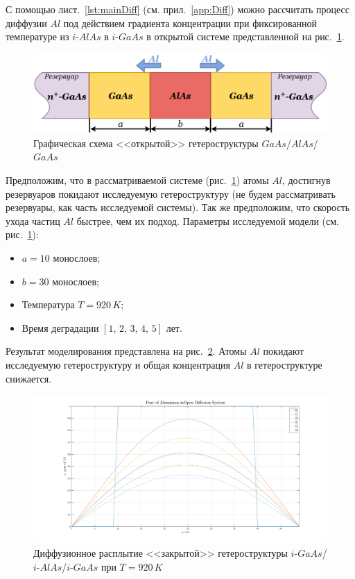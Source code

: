 С помощью лист.~\ref{lst:mainDiff} (см. прил.~\ref{app:Diff}) можно рассчитать процесс диффузии $Al$ под действием градиента концентрации при фиксированной температуре из $i$-$AlAs$ в $i$-$GaAs$ в открытой системе представленной на рис.~\ref{fig:DOpeneBox}.
\begin{figure}[h!]
	\centering
	\includegraphics[width=0.9\linewidth]{assets/DOpenBox}
	\caption{Графическая схема <<открытой>> гетероструктуры $GaAs$/$AlAs$/$GaAs$}
	\label{fig:DOpeneBox}
\end{figure}

Предположим, что в рассматриваемой системе (рис.~\ref{fig:DOpeneBox}) атомы $Al$, достигнув резервуаров покидают исследуемую гетероструктуру (не будем рассматривать резервуары, как часть исследуемой системы). Так же предположим, что скорость ухода частиц $Al$ быстрее, чем их подход. Параметры исследуемой модели (см. рис.~\ref{fig:DOpeneBox}):
\begin{itemize}
	\item $a = 10$ монослоев;
	\item $b = 30$ монослоев;
	\item Температура $T = 920\,K$;
	\item Время деградации $[1,\,2,\,3,\,4,\,5]$ лет.
\end{itemize}
Результат моделирования представлена на рис.~\ref{fig:DOAl}. Атомы $Al$ покидают исследуемую гетероструктуру и общая концентрация $Al$ в гетероструктуре снижается.

\begin{figure}[h!]
	\centering
	\includegraphics[width=0.9\linewidth]{assets/DOAl}
	\caption{Диффузионное расплытие <<закрытой>> гетероструктуры $i$-$GaAs$/$i$-$AlAs$/$i$-$GaAs$ при $T = 920\,K$}
	\label{fig:DOAl}
\end{figure}

